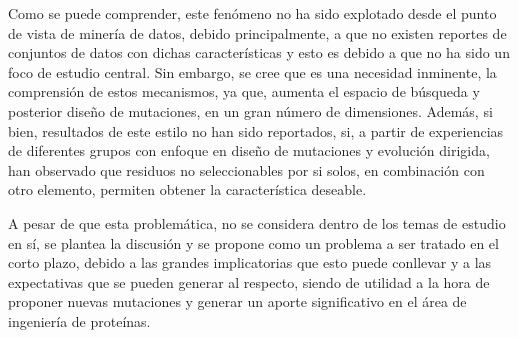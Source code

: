 Como se puede comprender, este fenómeno no ha sido explotado desde el punto de vista de minería de datos, debido principalmente, a que no existen reportes de conjuntos de datos con dichas características y esto es debido a que no ha sido un foco de estudio central. Sin embargo, se cree que es una necesidad inminente, la comprensión de estos mecanismos, ya que, aumenta el espacio de búsqueda y posterior diseño de mutaciones, en un gran número de dimensiones. Además, si bien, resultados de este estilo no han sido reportados, si, a partir de experiencias de diferentes grupos con enfoque en diseño de mutaciones y evolución dirigida, han observado que residuos no seleccionables por si solos, en combinación con otro elemento, permiten obtener la característica deseable.

A pesar de que esta problemática, no se considera dentro de los temas de estudio en sí, se plantea la discusión y se propone como un problema a ser tratado en el corto plazo, debido a las grandes implicatorias que esto puede conllevar y a las expectativas que se pueden generar al respecto, siendo de utilidad a la hora de proponer nuevas mutaciones y generar un aporte significativo en el área de ingeniería de proteínas.
 
